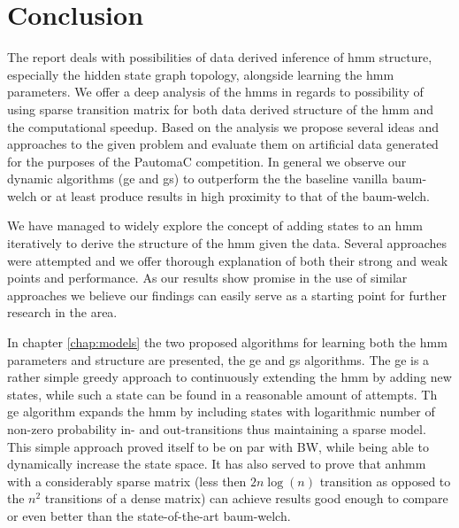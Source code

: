 \chapter{Conclusion}
\label{chap:conclusion}
The report deals with possibilities of data derived inference of \gls{hmm} structure, especially the hidden state graph topology, alongside learning the \gls{hmm} parameters. We offer a deep analysis of the \glspl{hmm} in regards to possibility of using sparse transition matrix for both data derived structure of the \gls{hmm} and the computational  speedup. Based on the analysis we propose several ideas and approaches to the given problem and evaluate them on artificial data generated for the purposes of the PautomaC competition. In general we observe our dynamic algorithms (\acrfull{ge} and \acrfull{gs}) to outperform the the baseline vanilla \gls{baum-welch} or at least produce results in high proximity to that of the \gls{baum-welch}.

We have managed to widely explore the concept of adding states to an \gls{hmm} iteratively to derive the structure of the \gls{hmm} given the data. Several approaches were attempted and we offer thorough explanation of both their strong and weak points and performance. As our results show promise in the use of similar approaches we believe our findings can easily serve as a starting point for further research in the area.

In chapter \ref{chap:models} the two proposed algorithms for learning both the \gls{hmm} parameters and structure are presented, the \acrlong{ge} and \acrlong{gs} algorithms. The \gls{ge} is a rather simple greedy approach to continuously extending the \gls{hmm} by adding new states, while such a state can be found in a reasonable amount of attempts. Th \gls{ge} algorithm expands the \gls{hmm} by including states with logarithmic number of non-zero probability in- and out-transitions thus maintaining a sparse model. This simple approach proved itself to be on par with BW, while being able to dynamically increase the state space. It has also served to prove that an\gls{hmm} with a considerably sparse matrix (less then $2n\log(n)$ transition as opposed to the $n^2$ transitions of a dense matrix) can achieve results good enough to compare or even better than the state-of-the-art \gls{baum-welch}.

